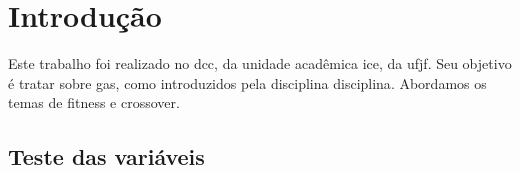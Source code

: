 \chapter{Introdução}%
\label{cap:introducao}


Este trabalho foi realizado no \gls{dcc}, da unidade acadêmica \gls{ice}, da \gls{ufjf}.
Seu objetivo é tratar sobre \glspl{ga}, como introduzidos pela disciplina \gls{disciplina}.
Abordamos os temas de \gls{fitness} e \gls{crossover}.

\section{Teste das variáveis}

\testaVariaveis{}

\lipsum[1-5]
